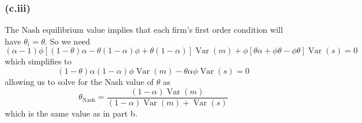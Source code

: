 \documentclass[12pt]{article}
\begin{document}
\subsubsection*{(c.iii)}

The Nash equilibrium value implies that each firm's first order condition will have $\theta_i = \theta$. So we need 
\[
(\alpha - 1) \phi [(1-\theta) \alpha - \theta (1-\alpha) \phi + \theta (1-\alpha)] \operatorname{Var}(m) + \phi[\theta \alpha + \phi \theta - \phi \theta] \operatorname{Var}(s) = 0
\]
which simplifies to 
\[
(1-\theta) \alpha (1 - \alpha) \phi \operatorname{Var}(m) - \theta \alpha \phi \operatorname{Var}(s) = 0
\]
allowing us to solve for the Nash value of $\theta$ as
\[
\theta_{\text{Nash}} = \frac{(1-\alpha) \operatorname{Var}(m)}{(1-\alpha) \operatorname{Var}(m) + \operatorname{Var}(s)}
\]
which is the same value as in part b.
\end{document}
